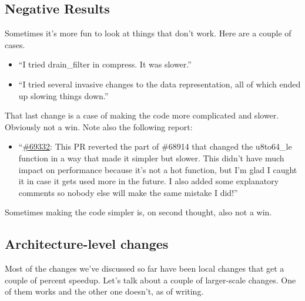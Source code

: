 \subsection*{Negative Results}
Sometimes it's more fun to look at things that don't work. Here are a couple of cases.
\begin{itemize}[noitemsep]
\item ``I tried drain\_filter in compress. It was slower.''
\item ``I tried several invasive changes to the data representation, all of which ended up slowing things down.''
\end{itemize}
That last change is a case of making the code more complicated and slower. Obviously not a win. Note also the following report:
\begin{itemize}[noitemsep]
\item ``\href{https://github.com/rust-lang/rust/pull/69332}{\#69332}: This PR reverted the part of \#68914 that changed the u8to64\_le function in a way that made it simpler but slower. This didn’t have much impact on performance because it’s not a hot function, but I’m glad I caught it in case it gets used more in the future. I also added some explanatory comments so nobody else will make the same mistake I did!''
\end{itemize}
Sometimes making the code simpler is, on second thought, also not a win.

\subsection*{Architecture-level changes}
Most of the changes we've discussed so far have been local changes that get a couple of
percent speedup. Let's talk about a couple of larger-scale changes. One of them works
and the other one doesn't, as of writing.

